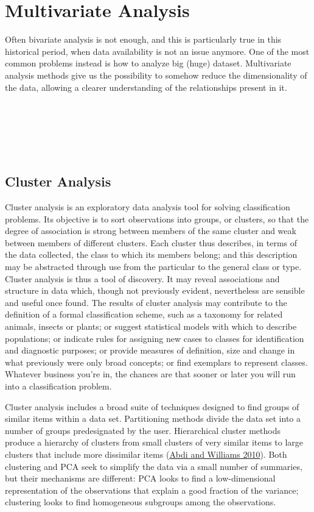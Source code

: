\documentclass[
]{article}
\begin{document}
\newpage

\hypertarget{multivariate-analysis}{%
\section{Multivariate Analysis}\label{multivariate-analysis}}

Often bivariate analysis is not enough, and this is particularly true in
this historical period, when data availability is not an issue anymore.
One of the most common problems instead is how to analyze big (huge)
dataset. Multivariate analysis methods give us the possibility to
somehow reduce the dimensionality of the data, allowing a clearer
understanding of the relationships present in it.

~

~

~

\hypertarget{cluster-analysis}{%
\subsection{Cluster Analysis}\label{cluster-analysis}}

Cluster analysis is an exploratory data analysis tool for solving
classification problems. Its objective is to sort observations into
groups, or clusters, so that the degree of association is strong between
members of the same cluster and weak between members of different
clusters. Each cluster thus describes, in terms of the data collected,
the class to which its members belong; and this description may be
abstracted through use from the particular to the general class or type.
Cluster analysis is thus a tool of discovery. It may reveal associations
and structure in data which, though not previously evident, nevertheless
are sensible and useful once found. The results of cluster analysis may
contribute to the definition of a formal classification scheme, such as
a taxonomy for related animals, insects or plants; or suggest
statistical models with which to describe populations; or indicate rules
for assigning new cases to classes for identification and diagnostic
purposes; or provide measures of definition, size and change in what
previously were only broad concepts; or find exemplars to represent
classes. Whatever business you're in, the chances are that sooner or
later you will run into a classification problem.

Cluster analysis includes a broad suite of techniques designed to find
groups of similar items within a data set. Partitioning methods divide
the data set into a number of groups predesignated by the user.
Hierarchical cluster methods produce a hierarchy of clusters from small
clusters of very similar items to large clusters that include more
dissimilar items (\protect\hyperlink{ref-abdi2010}{Abdi and Williams 2010}). Both clustering and PCA seek to simplify
the data via a small number of summaries, but their mechanisms are
different: PCA looks to find a low-dimensional representation of the
observations that explain a good fraction of the variance; clustering
looks to find homogeneous subgroups among the observations.
\end{document}
